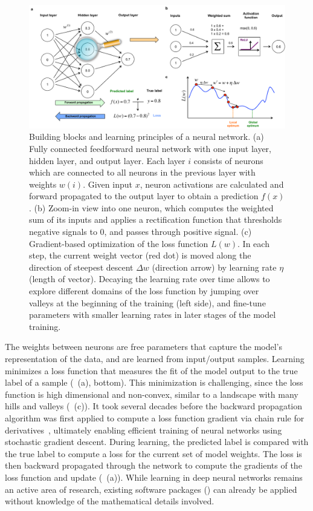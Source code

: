 \begin{figure}[htbp!]
\centering
\includegraphics[width=1.0\textwidth]{ann}
\caption[Building blocks and learning principles of a neural network.]{Building blocks and learning principles of a neural network. (a) Fully connected feedforward neural network with one input layer, hidden layer, and output layer.  Each layer $i$ consists of neurons which are connected to all neurons in the previous layer with weights $w(i)$. Given input $x$, neuron activations are calculated and forward propagated to the output layer to obtain a prediction $f(x)$. (b) Zoom-in view into one neuron, which computes the weighted sum of its inputs and applies a rectification function that thresholds negative signals to $0$, and passes through positive signal. (c) Gradient-based optimization of the loss function $L(w)$. In each step, the current weight vector (red dot) is moved along the direction of steepest descent $\Delta w$ (direction arrow) by learning rate $\eta$ (length of vector). Decaying the learning rate over time allows to explore different domains of the loss function by jumping over valleys at the beginning of the training (left side), and fine-tune parameters with smaller learning rates in later stages of the model training.}
\label{fig:dl_ann}
\end{figure}

The weights between neurons are free parameters that capture the model's representation of the data, and are learned from input/output samples. Learning minimizes a loss function that measures the fit of the model output to the true label of a sample (~(a), bottom). This minimization is challenging, since the loss function is high dimensional and non-convex, similar to a landscape with many hills and valleys (~(c)). It took several decades before the backward propagation algorithm was first applied to compute a loss function gradient via chain rule for derivatives~\citep{rumelhart_learning_1988}, ultimately enabling efficient training of neural networks using stochastic gradient descent. During learning, the predicted label is compared with the true label to compute a loss for the current set of model weights. The loss is then backward propagated through the network to compute the gradients of the loss function and update (~(a)). While learning in deep neural networks remains an active area of research, existing software packages () can already be applied without knowledge of the mathematical details involved.

